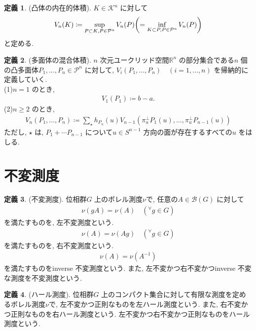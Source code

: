 \documentclass[10pt, fleqn, label-section=none]{bxjsarticle}
\theoremstyle{definition}
\newtheorem{dfn}{定義}[section]
\newcommand{\any}{{}^{\forall}}
\newcommand{\paren}[1]{\mleft( #1\mright )}
\renewcommand{\;}{\, ; \,}
\begin{document}
\begin{dfn}(凸体の内在的体積). $K \in \mathcal K^n$ に対して
\begin{align*} V_n (K) \coloneqq  \sup_{P \subset K, P \in \mathcal P^n} V_n (P)  \paren{ = \inf_{K \subset P, P \in \mathcal P^n} V_n (P) }  \end{align*}
と定める. 
\end{dfn}

\begin{dfn}(多面体の混合体積). $n$ 次元ユークリッド空間$\mathbb R^n$ の部分集合である$n$ 個の凸多面体$P_1, \ldots , P_n \in \mathcal P^n$ に対して, $V_i(P_1, \ldots, P_n) \quad ( i = 1, \ldots , n)$ を帰納的に定義していく. \\
(1)$n = 1$ のとき, 
\begin{align*} V_1(P_1) \coloneqq b-a.\end{align*}
(2)$n \geq 2 $ のとき, 
\begin{align*}V_n (P_1,\ldots , P_n) \coloneqq \sum_{\star} h_{P_n} (u) V_{n-1} (\pi^\perp_u P_1 (u) ,  \ldots ,\pi^\perp_u P_{n-1} (u))  \end{align*}
ただし, $\star$ は, $P_1 + \cdots P_{n-1}$ について$u \in S^{n-1}$ 方向の面が存在するすべての$u$ をはしる. 
\end{dfn}







\section{不変測度}


\begin{dfn}(不変測度). 位相群$G$ 上のボレル測度$\nu$で,  任意の$A \in \mathcal B (G)$ に対して
\begin{align*} \nu(gA) = \nu(A) \quad (\any g \in G)\end{align*}
を満たすものを, 左不変測度という. 
\begin{align*} \nu(A) = \nu(Ag) \quad (\any g \in G)\end{align*}
を満たすものを, 右不変測度という. 
\begin{align*} \nu(A) = \nu(A^{-1}) \end{align*}
を満たすものをinverse 不変測度という. また, 左不変かつ右不変かつinverse 不変な測度を不変測度という.
\end{dfn}

\begin{dfn}(ハール測度). 位相群$G$ 上のコンパクト集合に対して有限な測度を定めるボレル測度$\nu$で, 左不変かつ正則なものを左ハール測度という. また, 右不変かつ正則なものを右ハール測度という. 左不変かつ右不変かつ正則なものをハール測度という.

\end{dfn}
\end{document}

